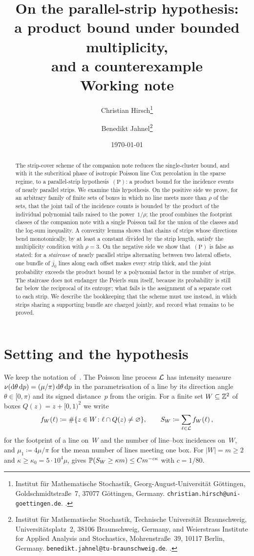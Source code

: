 \documentclass[11pt,letterpaper]{article}
\title{\textbf{On the parallel-strip hypothesis:\\ a product bound under bounded multiplicity,\\ and a counterexample}\\[0.6em] \large Working note}
\author{%
  Christian Hirsch\thanks{Institut f\"ur Mathematische Stochastik, Georg-August-Universit\"at G\"ottingen, Goldschmidtstra\ss e~7, 37077 G\"ottingen, Germany. \texttt{christian.hirsch@uni-goettingen.de}. \orcid{0000-0003-4136-3740}.}
  \and
  Benedikt Jahnel\thanks{Institut f\"ur Mathematische Stochastik, Technische Universit\"at Braunschweig, Universit\"atsplatz~2, 38106 Braunschweig, Germany, and Weierstrass Institute for Applied Analysis and Stochastics, Mohrenstra\ss e~39, 10117 Berlin, Germany. \texttt{benedikt.jahnel@tu-braunschweig.de}. \orcid{0000-0002-4212-0065}.}%
}
\date{\today}
\begin{document}
\maketitle
\thispagestyle{plain}

\begin{abstract}
The strip-cover scheme of the companion note reduces the single-cluster bound, and with it the subcritical phase of isotropic Poisson line Cox percolation in the sparse regime, to a parallel-strip hypothesis~$\mathrm{(P)}$: a product bound for the incidence events of nearly parallel strips. We examine this hypothesis. On the positive side we prove, for an arbitrary family of finite sets of boxes in which no line meets more than $\rho$ of the sets, that the joint tail of the incidence counts is bounded by the product of the individual polynomial tails raised to the power~$1/\rho$; the proof combines the footprint classes of the companion note with a single Poisson tail for the union of the classes and the log-sum inequality. A convexity lemma shows that chains of strips whose directions bend monotonically, by at least a constant divided by the strip length, satisfy the multiplicity condition with $\rho=3$. On the negative side we show that~$\mathrm{(P)}$ is false as stated: for a \emph{staircase} of nearly parallel strips alternating between two lateral offsets, one bundle of $j_0$ lines along each offset makes every strip thick, and the joint probability exceeds the product bound by a polynomial factor in the number of strips. The staircase does not endanger the Peierls sum itself, because its probability is still far below the reciprocal of its entropy; what fails is the assignment of a separate cost to each strip. We describe the bookkeeping that the scheme must use instead, in which strips sharing a supporting bundle are charged jointly, and record what remains to be proved.
\end{abstract}

\section{Setting and the hypothesis}
\label{sec:setting}

We keep the notation of~\cite{SC26}. The Poisson line process $\cL$ has intensity measure $\nu(\d\theta\,\d p)=(\mu/\pi)\dd\theta\dd p$ in the parametrisation of a line by its direction angle $\theta\in[0,\pi)$ and its signed distance~$p$ from the origin. For a finite set $W\subseteq\Z^2$ of boxes $Q(z)=z+[0,1)^2$ we write
\begin{equation*}
  f_W(\ell)\coloneqq\#\{z\in W\colon\ell\cap Q(z)\neq\varnothing\},\qquad S_W\coloneqq\sum_{\ell\in\cL}f_W(\ell)\,,
\end{equation*}
for the footprint of a line on~$W$ and the number of line--box incidences on~$W$, and $\mu_1\coloneqq4\mu/\pi$ for the mean number of lines meeting one box. For $\lvert W\rvert=m\ge2$ and $\kappa\ge\kappa_0=5\cdot10^4\mu$, \cite[Theorem~2.1]{SC26} gives $\P(S_W\ge\kappa m)\le Cm^{-c\kappa}$ with $c=1/80$.
\end{document}
